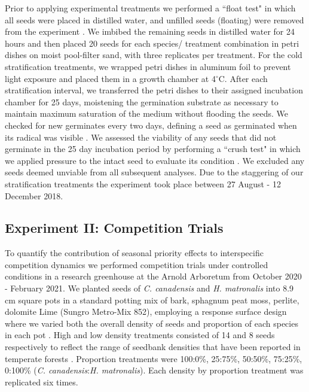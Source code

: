 \documentclass{article}[11pt]
\begin{document}
\noindent  Prior to applying experimental treatments we performed a ``float test" in which all seeds were placed in distilled water, and unfilled seeds (floating) were removed from the experiment \citep{Baskin2014}. We imbibed the remaining seeds in distilled water for 24 hours and then placed 20 seeds for each species/ treatment combination in petri dishes on moist pool-filter sand, with three replicates per treatment. For the cold stratification treatments, we wrapped petri dishes in aluminum foil to prevent light exposure and placed them in a growth chamber at 4$^{\circ}$C. After each stratification interval, we transferred the petri dishes to their assigned incubation chamber for 25 days, moistening the germination substrate as necessary to maintain maximum saturation of the medium without flooding the seeds. We checked for new germinates every two days, defining a seed as germinated when its radical was visible \citep{Baskin2014}. We assessed the viability of any seeds that did not germinate in the 25 day incubation period by performing a ``crush test" in which we applied pressure to the intact seed to evaluate its condition \citep{Baskin2014}. We excluded any seeds deemed unviable from all subsequent analyses. Due to the staggering of our stratification treatments the experiment took place between 27 August - 12 December 2018.

\subsection*{Experiment II: Competition Trials}
\noindent To quantify the contribution of seasonal priority effects to interspecific competition dynamics we performed competition trials under controlled conditions in a research greenhouse at the Arnold Arboretum from October 2020 - February 2021. We planted seeds of \textit{C. canadensis} and \textit{H. matronalis} into 8.9 cm square pots in a standard potting mix of bark, sphagnum peat moss, perlite, dolomite Lime (Sungro Metro-Mix 852), employing a response surface design where we varied both the overall density of seeds and proportion of each species in each pot \citep{Inouye2001}. High and low density treatments consisted of 14 and 8 seeds respectively to reflect the range of seedbank densities that have been reported in temperate forests \citep{Leckie:2000tb,Bossuyt:2002un,Decocq:2004tq}. Proportion treatments were 100:0\%, 25:75\%, 50:50\%, 75:25\%, 0:100\% (\textit{C. canadensis}:\textit{H. matronalis}). Each density by proportion treatment was replicated six times.
\end{document}
